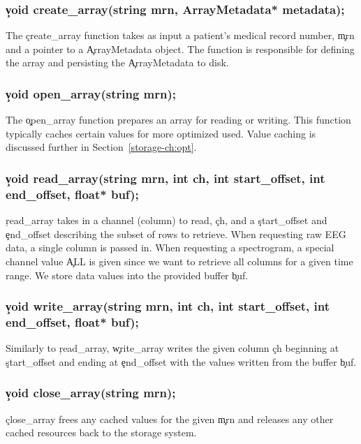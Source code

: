 \subsubsection{\c{void create\_array(string mrn, ArrayMetadata* metadata);}}

The \c{create\_array} function takes as input a patient's medical record
number, \c{mrn} and a pointer to a \c{ArrayMetadata} object. The function is
responsible for defining the array and persisting the \c{ArrayMetadata} to
disk.

\subsubsection{\c{void open\_array(string mrn);}}

The \c{open\_array} function prepares an array for reading or writing. This
function typically caches certain values for more optimized used. Value caching is
discussed further in Section~\ref{storage-ch:opt}.

\subsubsection{\c{void read\_array(string mrn, int ch, int start\_offset, int end\_offset, float* buf);}}

\c{read\_array} takes in a channel (column) to read, \c{ch}, and a
\c{start\_offset} and \c{end\_offset} describing the subset of rows to
retrieve. When requesting raw EEG data, a single column is passed in. When
requesting a spectrogram, a special channel value \c{ALL} is given since we
want to retrieve all columns for a given time range. We store data values into
the provided buffer \c{buf}.

\subsubsection{\c{void write\_array(string mrn, int ch, int start\_offset, int end\_offset, float* buf);}}

Similarly to \c{read\_array}, \c{write\_array} writes the given column \c{ch}
beginning at \c{start\_offset} and ending at \c{end\_offset} with the values
written from the buffer \c{buf}.

\subsubsection{\c{void close\_array(string mrn);}}

\c{close\_array} frees any cached values for the given \c{mrn} and releases any
other cached resources back to the storage system.

